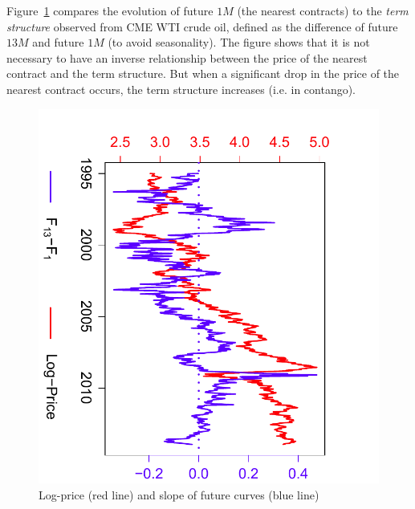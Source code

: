 Figure~\ref{fig:LogPriceTermStructure:data} compares the evolution of future $1M$ (the nearest contracts) to the \emph{term structure} observed from CME WTI crude oil, defined as the difference of future $13M$ and future $1M$ (to avoid seasonality). The figure shows that it is not necessary to have an inverse relationship between the  price of the nearest contract and the term structure. But when a significant drop in the price  of the nearest contract occurs, the term structure increases (i.e. in contango).
\begin{figure}
\centering
\includegraphics[scale=.6,angle=90]{LogPrice_TermStructure}
\caption{Log-price (red line) and slope of future curves (blue line)}
\label{fig:LogPriceTermStructure:data}
\end{figure}


